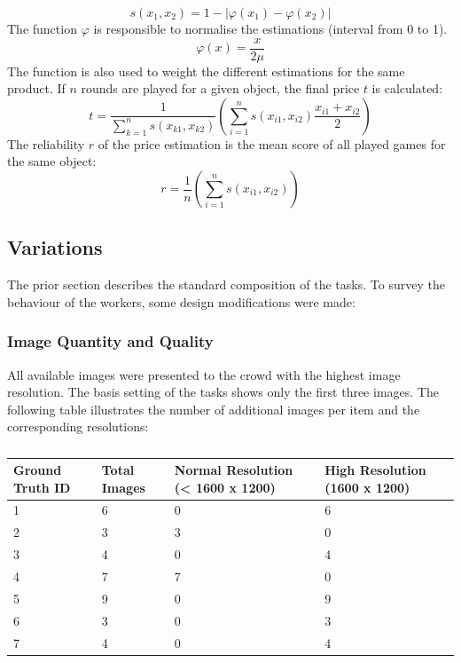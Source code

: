 \begin{equation}
s(x_1,x_2) = 1 - |\varphi(x_1) - \varphi(x_2)|
\end{equation}
The function \( \varphi \) is responsible to normalise the estimations (interval from 0 to 1).
\begin{equation}
\varphi(x) = \frac{x}{2\mu}
\end{equation}
The function is also used to weight the different estimations for the same product. If \( n \) rounds are played for a given object, the final price \( t \) is calculated:
\begin{equation}
t = \frac{1}{\sum_{k=1}^{n} s(x_{k1},x_{k2})}\left(\sum_{i=1}^{n} s(x_{i1},x_{i2})\frac{x_{i1}+x_{i2}}{2}\right)
\end{equation}
The reliability \( r \) of the price estimation is the mean score of all played games for the same object:
\begin{equation}
r = \frac{1}{n}\left(\sum_{i=1}^{n} s(x_{i1},x_{i2})\right)
\end{equation}

\subsection{Variations}
The prior section describes the standard composition of the tasks. To survey the behaviour of the workers, some design modifications were made: 
\subsubsection{Image Quantity and Quality}

All available images were presented to the crowd with the highest image resolution. The basis setting of the tasks shows only the first three images. The following table illustrates the number of additional images per item and the corresponding resolutions: 
\begin{table}[h!]
	\begin{center}
	\begin{tabular}{| l | l | l | p{10cm} |}
		\hline
		Ground Truth ID & Total Images & Normal Resolution (< 1600 x 1200) & High Resolution (1600 x 1200) \\
		\hline
		1 & 6 & 0 & 6 \\
		\hline
		2 & 3 & 3 & 0 \\
		\hline
		3 & 4 & 0 & 4 \\
		\hline
		4 & 7 & 7 & 0 \\
		\hline
		5 & 9 & 0 & 9 \\
		\hline
		6 & 3 & 0 & 3 \\
		\hline
		7 & 4 & 0 & 4 \\
		\hline
	\end{tabular}
	\end{center}
	\caption{}
\end{table}
